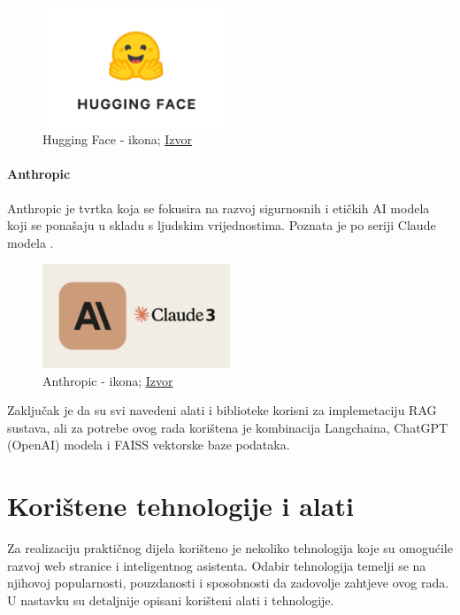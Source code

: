 \documentclass[]{foi}
\begin{document}
\begin{figure}[h]
  \centering
  \includegraphics[width=0.5\textwidth]{./assets/hugging_face_icon.png}
  \caption{Hugging Face - ikona; \href{https://miro.medium.com/v2/resize:fit:463/1*y_0d92c-kSZGrSErMeYWbQ.png}{Izvor}}
  \label{fig:slika12}
\end{figure}

\subsubsection{Anthropic}
Anthropic je tvrtka koja se fokusira na razvoj sigurnosnih i etičkih AI modela koji se ponašaju u skladu s ljudskim vrijednostima. Poznata je po seriji Claude modela \cite{ozkaya2025llm}. 

\begin{figure}[h]
  \centering
  \includegraphics[width=0.5\textwidth]{./assets/anthropic.png}
  \caption{Anthropic - ikona; \href{https://miro.medium.com/v2/resize:fit:1024/0*bg0UgmZY3YP0p0FB.png}{Izvor}}
  \label{fig:slika11}
\end{figure}

Zaključak je da su svi navedeni alati i biblioteke korisni za implemetaciju RAG sustava, ali za potrebe ovog rada korištena je kombinacija
Langchaina, ChatGPT (OpenAI) modela i FAISS vektorske baze podataka. 



\chapter{Korištene tehnologije i alati}
Za realizaciju praktičnog dijela korišteno je nekoliko tehnologija koje su omogućile razvoj web stranice i inteligentnog asistenta. 
Odabir tehnologija temelji se na njihovoj popularnosti, pouzdanosti i sposobnosti da zadovolje zahtjeve ovog rada. U nastavku su detaljnije
opisani korišteni alati i tehnologije.
\end{document}
